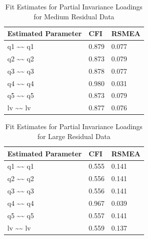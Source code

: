 \documentclass[
  man]{apa7}
\begin{document}
\begin{table}[tbp]

\begin{center}
\begin{threeparttable}

\caption{\label{tab:p-tab19}Fit Estimates for Partial Invariance Loadings for Medium Residual Data}

\begin{tabular}{lll}
\toprule
Estimated Parameter & CFI & RSMEA\\
\midrule
q1 \textasciitilde{}\textasciitilde{} q1 & 0.879 & 0.077\\
q2 \textasciitilde{}\textasciitilde{} q2 & 0.873 & 0.079\\
q3 \textasciitilde{}\textasciitilde{} q3 & 0.878 & 0.077\\
q4 \textasciitilde{}\textasciitilde{} q4 & 0.980 & 0.031\\
q5 \textasciitilde{}\textasciitilde{} q5 & 0.873 & 0.079\\
lv \textasciitilde{}\textasciitilde{} lv & 0.877 & 0.076\\
\bottomrule
\end{tabular}

\end{threeparttable}
\end{center}

\end{table}

\begin{table}[tbp]

\begin{center}
\begin{threeparttable}

\caption{\label{tab:p-tab20}Fit Estimates for Partial Invariance Loadings for Large Residual Data}

\begin{tabular}{lll}
\toprule
Estimated Parameter & CFI & RSMEA\\
\midrule
q1 \textasciitilde{}\textasciitilde{} q1 & 0.555 & 0.141\\
q2 \textasciitilde{}\textasciitilde{} q2 & 0.556 & 0.141\\
q3 \textasciitilde{}\textasciitilde{} q3 & 0.556 & 0.141\\
q4 \textasciitilde{}\textasciitilde{} q4 & 0.967 & 0.039\\
q5 \textasciitilde{}\textasciitilde{} q5 & 0.557 & 0.141\\
lv \textasciitilde{}\textasciitilde{} lv & 0.559 & 0.137\\
\bottomrule
\end{tabular}

\end{threeparttable}
\end{center}

\end{table}
\end{document}
